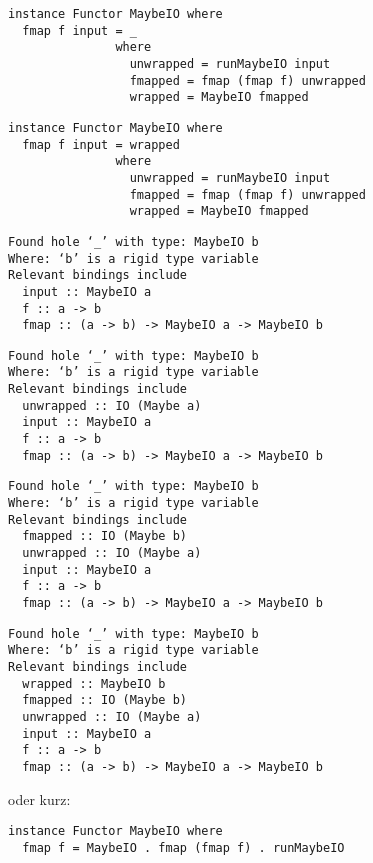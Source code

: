 \documentclass{beamer}
\begin{document}
\begin{frame}[fragile]
\begin{overprint}
\begin{verbatim}
\end{verbatim}
\begin{verbatim}
instance Functor MaybeIO where
  fmap f input = _
               where
                 unwrapped = runMaybeIO input
                 fmapped = fmap (fmap f) unwrapped
                 wrapped = MaybeIO fmapped
\end{verbatim}
\begin{verbatim}
instance Functor MaybeIO where
  fmap f input = wrapped
               where
                 unwrapped = runMaybeIO input
                 fmapped = fmap (fmap f) unwrapped
                 wrapped = MaybeIO fmapped
\end{verbatim}
\end{overprint}
\bigskip
\scriptsize
\begin{overprint}
\begin{verbatim}
Found hole ‘_’ with type: MaybeIO b
Where: ‘b’ is a rigid type variable
Relevant bindings include
  input :: MaybeIO a
  f :: a -> b
  fmap :: (a -> b) -> MaybeIO a -> MaybeIO b
\end{verbatim}
\begin{verbatim}
Found hole ‘_’ with type: MaybeIO b
Where: ‘b’ is a rigid type variable
Relevant bindings include
  unwrapped :: IO (Maybe a)
  input :: MaybeIO a
  f :: a -> b
  fmap :: (a -> b) -> MaybeIO a -> MaybeIO b
\end{verbatim}
\begin{verbatim}
Found hole ‘_’ with type: MaybeIO b
Where: ‘b’ is a rigid type variable
Relevant bindings include
  fmapped :: IO (Maybe b)
  unwrapped :: IO (Maybe a)
  input :: MaybeIO a
  f :: a -> b
  fmap :: (a -> b) -> MaybeIO a -> MaybeIO b
\end{verbatim}
\begin{verbatim}
Found hole ‘_’ with type: MaybeIO b
Where: ‘b’ is a rigid type variable
Relevant bindings include
  wrapped :: MaybeIO b
  fmapped :: IO (Maybe b)
  unwrapped :: IO (Maybe a)
  input :: MaybeIO a
  f :: a -> b
  fmap :: (a -> b) -> MaybeIO a -> MaybeIO b
\end{verbatim}
\normalsize
oder kurz:
\begin{verbatim}
instance Functor MaybeIO where
  fmap f = MaybeIO . fmap (fmap f) . runMaybeIO
\end{verbatim}
\end{overprint}
\end{frame}
\end{document}
